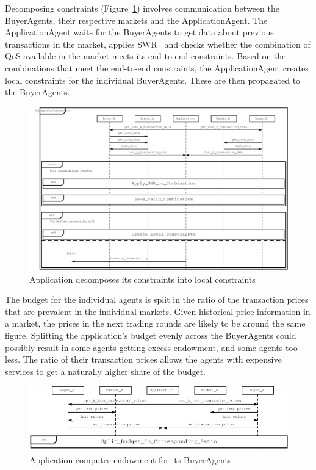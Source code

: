 \documentclass[10pt,journal,compsoc]{IEEEtran}
\begin{document}
Decomposing constraints (Figure~\ref{fig:decompose_constraints}) involves communication between the BuyerAgents, their respective markets and the ApplicationAgent. The ApplicationAgent waits for the BuyerAgents to get data about previous transactions in the market, applies SWR~\cite{Cardoso2002Workflow} and checks whether the combination of QoS available in the market meets its end-to-end constraints. Based on the combinations that meet the end-to-end constraints, the ApplicationAgent creates local constraints for the individual BuyerAgents. These are then propagated to the BuyerAgents.
\begin{figure}[h]
\centering
\includegraphics[scale=0.7]{drawings/decompose_constraints.pdf}
\caption{Application decomposes its constraints into local constraints \label{fig:decompose_constraints}}
\end{figure}

The budget for the individual agents is split in the ratio of the transaction prices that are prevalent in the individual markets. Given historical price information in a market, the prices in the next trading rounds are likely to be around the same figure. Splitting the application's budget evenly across the BuyerAgents could possibly result in some agents getting excess endowment, and some agents too less. The ratio of their transaction prices allows the agents with expensive services to get a naturally higher share of the budget.
\begin{figure}[h]
\centering
\includegraphics[scale=0.7]{drawings/compute_endowment.pdf}
\caption{Application computes endowment for its BuyerAgents}
\end{figure}
\end{document}
